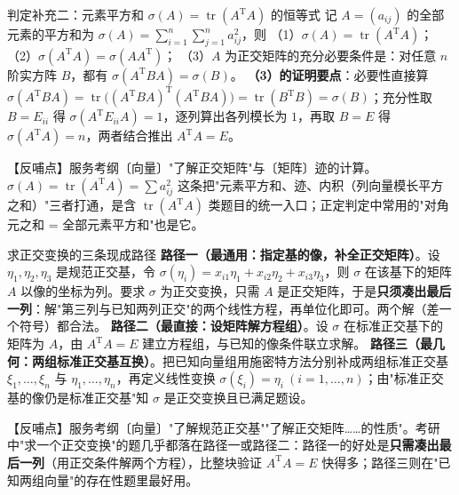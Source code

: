 \begin{fdeep}{判定补充二：元素平方和 $\sigma(A)=\operatorname{tr}(A^{\mathrm T}A)$ 的恒等式}
记 $A=(a_{ij})$ 的全部元素的平方和为 $\sigma(A)=\sum_{i=1}^{n}\sum_{j=1}^{n}a_{ij}^{2}$，则
（1）$\sigma(A)=\operatorname{tr}(A^{\mathrm T}A)$；
（2）$\sigma(A^{\mathrm T}A)=\sigma(AA^{\mathrm T})$；
（3）$A$ 为正交矩阵的充分必要条件是：对任意 $n$ 阶实方阵 $B$，都有 $\sigma(A^{\mathrm T}BA)=\sigma(B)$。
\textbf{（3）的证明要点}：必要性直接算
$\sigma(A^{\mathrm T}BA)=\operatorname{tr}\bigl((A^{\mathrm T}BA)^{\mathrm T}(A^{\mathrm T}BA)\bigr)=\operatorname{tr}(B^{\mathrm T}B)=\sigma(B)$；充分性取 $B=E_{ii}$ 得 $\sigma(A^{\mathrm T}E_{ii}A)=1$，逐列算出各列模长为 $1$，再取 $B=E$ 得 $\sigma(A^{\mathrm T}A)=n$，两者结合推出 $A^{\mathrm T}A=E$。

【反哺点】服务考纲〔向量〕"了解正交矩阵"与〔矩阵〕迹的计算。$\sigma(A)=\operatorname{tr}(A^{\mathrm T}A)=\sum a_{ij}^{2}$ 这条把"元素平方和、迹、内积（列向量模长平方之和）"三者打通，是含 $\operatorname{tr}(A^{\mathrm T}A)$ 类题目的统一入口；正定判定中常用的"对角元之和 = 全部元素平方和"也是它。
\end{fdeep}


\begin{fdeep}{求正交变换的三条现成路径}
\textbf{路径一（最通用：指定基的像，补全正交矩阵）}。设 $\eta_{1},\eta_{2},\eta_{3}$ 是规范正交基，令 $\sigma(\eta_{i})=x_{i1}\eta_{1}+x_{i2}\eta_{2}+x_{i3}\eta_{3}$，则 $\sigma$ 在该基下的矩阵 $A$ 以像的坐标为列。要求 $\sigma$ 为正交变换，只需 $A$ 是正交矩阵，于是\textbf{只须凑出最后一列}：解"第三列与已知两列正交"的两个线性方程，再单位化即可。两个解（差一个符号）都合法。
\textbf{路径二（最直接：设矩阵解方程组）}。设 $\sigma$ 在标准正交基下的矩阵为 $A$，由 $A^{\mathrm T}A=E$ 建立方程组，与已知的像条件联立求解。
\textbf{路径三（最几何：两组标准正交基互换）}。把已知向量组用施密特方法分别补成两组标准正交基 $\xi_{1},\dots,\xi_{n}$ 与 $\eta_{1},\dots,\eta_{n}$，再定义线性变换 $\sigma(\xi_{i})=\eta_{i}\ (i=1,\dots,n)$；由"标准正交基的像仍是标准正交基"知 $\sigma$ 是正交变换且已满足题设。

【反哺点】服务考纲〔向量〕"了解规范正交基""了解正交矩阵……的性质"。考研中"求一个正交变换"的题几乎都落在路径一或路径二：路径一的好处是\textbf{只需凑出最后一列}（用正交条件解两个方程），比整块验证 $A^{\mathrm T}A=E$ 快得多；路径三则在"已知两组向量"的存在性题里最好用。
\end{fdeep}


